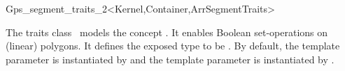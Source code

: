 \ccRefPageBegin

\begin{ccRefClass}{Gps_segment_traits_2<Kernel,Container,ArrSegmentTraits>}

\ccThreeToTwo

\ccDefinition
The traits class \ccRefName\ models the concept 
. It enables Boolean set-operations on 
(linear) polygons. It defines the exposed type  to be 
. By default, the template 
parameter  is instantiated by 
 and the template parameter
 is instantiated by 
.


 
\ccIsModel

\end{ccRefClass}
\ccRefPageEnd
